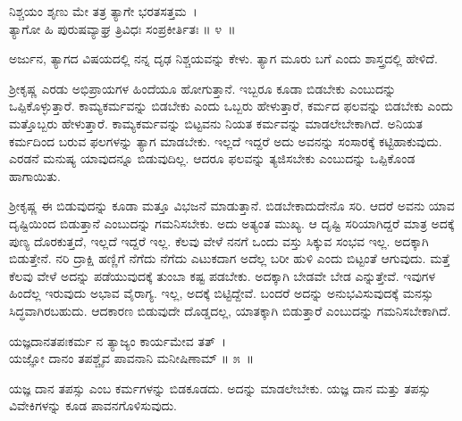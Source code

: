 \begin{shloka}
ನಿಶ್ಚಯಂ ಶೃಣು ಮೇ ತತ್ರ ತ್ಯಾಗೇ ಭರತಸತ್ತಮ~।\\ತ್ಯಾಗೋ ಹಿ ಪುರುಷವ್ಯಾಘ್ರ ತ್ರಿವಿಧಃ ಸಂಪ್ರಕೀರ್ತಿತಃ \hfill॥ ೪~॥
\end{shloka}

\begin{artha}
ಅರ್ಜುನ, ತ್ಯಾಗದ ವಿಷಯದಲ್ಲಿ ನನ್ನ ದೃಢ ನಿಶ್ಚಯವನ್ನು ಕೇಳು. ತ್ಯಾಗ ಮೂರು ಬಗೆ ಎಂದು ಶಾಸ್ತ್ರದಲ್ಲಿ ಹೇಳಿದೆ.
\end{artha}

ಶ‍್ರೀಕೃಷ್ಣ ಎರಡು ಅಭಿಪ್ರಾಯಗಳ ಹಿಂದೆಯೂ ಹೋಗುತ್ತಾನೆ. ಇಬ್ಬರೂ ಕೂಡಾ ಬಿಡಬೇಕು ಎಂಬುದನ್ನು ಒಪ್ಪಿಕೊಳ್ಳುತ್ತಾರೆ. ಕಾಮ್ಯಕರ್ಮವನ್ನು ಬಿಡಬೇಕು ಎಂದು ಒಬ್ಬರು ಹೇಳುತ್ತಾರೆ, ಕರ್ಮದ ಫಲವನ್ನು ಬಿಡಬೇಕು ಎಂದು ಮತ್ತೊಬ್ಬರು ಹೇಳುತ್ತಾರೆ. ಕಾಮ್ಯಕರ್ಮವನ್ನು ಬಿಟ್ಟವನು ನಿಯತ ಕರ್ಮವನ್ನು ಮಾಡಲೇಬೇಕಾಗಿದೆ. ಅನಿಯತ ಕರ್ಮದಿಂದ ಬರುವ ಫಲಗಳನ್ನು ತ್ಯಾಗ ಮಾಡಬೇಕು. ಇಲ್ಲದೆ ಇದ್ದರೆ ಅದು ಅವನನ್ನು ಸಂಸಾರಕ್ಕೆ ಕಟ್ಟಿಹಾಕುವುದು. ಎರಡನೆ ಮನುಷ್ಯ ಯಾವುದನ್ನೂ ಬಿಡುವುದಿಲ್ಲ. ಆದರೂ ಫಲವನ್ನು ತ್ಯಜಿಸಬೇಕು ಎಂಬುದನ್ನು ಒಪ್ಪಿಕೊಂಡ ಹಾಗಾಯಿತು.

ಶ‍್ರೀಕೃಷ್ಣ ಈ ಬಿಡುವುದನ್ನು ಕೂಡಾ ಮತ್ತೂ ವಿಭಜನೆ ಮಾಡುತ್ತಾನೆ. ಬಿಡಬೇಕಾದುದೇನೊ ಸರಿ. ಆದರೆ ಅವನು ಯಾವ ದೃಷ್ಟಿಯಿಂದ ಬಿಡುತ್ತಾನೆ ಎಂಬುದನ್ನು ಗಮನಿಸಬೇಕು. ಅದು ಅತ್ಯಂತ ಮುಖ್ಯ. ಆ ದೃಷ್ಟಿ ಸರಿಯಾಗಿದ್ದರೆ ಮಾತ್ರ ಅದಕ್ಕೆ ಪುಣ್ಯ ದೊರಕುತ್ತದೆ, ಇಲ್ಲದೆ ಇದ್ದರೆ ಇಲ್ಲ. ಕೆಲವು ವೇಳೆ ನನಗೆ ಒಂದು ವಸ್ತು ಸಿಕ್ಕುವ ಸಂಭವ ಇಲ್ಲ. ಅದಕ್ಕಾಗಿ ಬಿಡುತ್ತೇನೆ. ನರಿ ದ್ರಾಕ್ಷಿ ಹಣ್ಣಿಗೆ ನೆಗೆದು ನೆಗೆದು ಎಟುಕದಾಗ ಅದೆಲ್ಲ ಬರೀ ಹುಳಿ ಎಂದು ಬಿಟ್ಟಂತೆ ಆಗುವುದು. ಮತ್ತೆ ಕೆಲವು ವೇಳೆ ಅದನ್ನು ಪಡೆಯುವುದಕ್ಕೆ ತುಂಬಾ ಕಷ್ಟ ಪಡಬೇಕು. ಅದಕ್ಕಾಗಿ ಬೇಡವೇ ಬೇಡ ಎನ್ನುತ್ತೇವೆ. ಇವುಗಳ ಹಿಂದೆಲ್ಲ ಇರುವುದು ಅಭಾವ ವೈರಾಗ್ಯ. ಇಲ್ಲ, ಅದಕ್ಕೆ ಬಿಟ್ಟಿದ್ದೇವೆ. ಬಂದರೆ ಅದನ್ನು ಅನುಭವಿಸುವುದಕ್ಕೆ ಮನಸ್ಸು ಸಿದ್ಧವಾಗಿರಬಹುದು. ಆದಕಾರಣ ಬಿಡುವುದೇ ದೊಡ್ಡದಲ್ಲ, ಯಾತಕ್ಕಾಗಿ ಬಿಡುತ್ತಾರೆ ಎಂಬುದನ್ನು ಗಮನಿಸಬೇಕಾಗಿದೆ.

\begin{shloka}
ಯಜ್ಞದಾನತಪಃಕರ್ಮ ನ ತ್ಯಾಜ್ಯಂ ಕಾರ್ಯಮೇವ ತತ್~।\\ಯಜ್ಞೋ ದಾನಂ ತಪಶ್ಚೈವ ಪಾವನಾನಿ ಮನೀಷಿಣಾಮ್ \hfill॥ ೫~॥
\end{shloka}

\begin{artha}
ಯಜ್ಞ ದಾನ ತಪಸ್ಸು ಎಂಬ ಕರ್ಮಗಳನ್ನು ಬಿಡಕೂಡದು. ಅದನ್ನು ಮಾಡಲೇಬೇಕು. ಯಜ್ಞ ದಾನ ಮತ್ತು ತಪಸ್ಸು ವಿವೇಕಿಗಳನ್ನು ಕೂಡ ಪಾವನಗೊಳಿಸುವುದು.
\end{artha}

